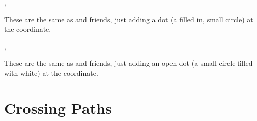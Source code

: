 \documentclass[10pt]{article}
\begin{document}
\begin{codedescribe}{\dotcoord,\dotpincoord}
\begin{codesyntax}%
\tsobj{\dotcoord}\tsverb{(}\tsverb{)}
\tsobj{\dotpincoord}\tsverb{(}\tsverb{)}
\tsobj{\dotpincoord}\tsverb{(}\tsverb{)}
\tsobj{\dotpincoord}\tsverb{(}\tsverb{)}
\tsobj{\dotpincoord}\tsverb{(}\tsverb{)}
\end{codesyntax}
These are the same as \tsobj{\ncoord} and friends, just adding a dot (a filled in, small circle) at the coordinate.
\end{codedescribe}

\begin{codedescribe}{\odotcoord,\odotpincoord}
\begin{codesyntax}%
\tsobj{\odotcoord}\tsverb{(}\tsverb{)}
\tsobj{\odotpincoord}\tsverb{(}\tsverb{)}
\tsobj{\odotpincoord}\tsverb{(}\tsverb{)}
\tsobj{\odotpincoord}\tsverb{(}\tsverb{)}
\tsobj{\odotpincoord}\tsverb{(}\tsverb{)}
\end{codesyntax}
These are the same as \tsobj{\ncoord} and friends, just adding an open dot (a small circle filled with white) at the coordinate.
\end{codedescribe}



\section{Crossing Paths}\label{pathcross}
\end{document}
